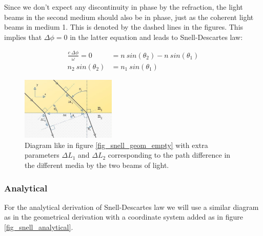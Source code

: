 \documentclass{article}
\begin{document}
Since we don't expect any discontinuity in phase by the refraction, the light beams in the second medium should also be in phase, just as the coherent light beams in medium 1. This is denoted by the dashed lines in the figures. This implies that $\Delta \phi = 0$ in the latter equation and leads to Snell-Descartes law:

\begin{align*}
	\frac{c \: \Delta \phi}{\omega} = 0 &=  n \: sin(\theta_2) - n \: sin(\theta_1) \\
	 n_2 \: sin(\theta_2) &= n_1 \: sin(\theta_1)
\end{align*}


\begin{figure}[h!]
	\centering
	\includegraphics[width=0.4\textwidth]{afbeeldingen/snell_geom.jpg}
	\caption{Diagram like in figure \ref{fig_snell_geom_empty} with extra parameters $\Delta L_1$ and $\Delta L_2$ corresponding to the path difference in the different media by the two beams of light.}
	\label{fig_snell_geom}
\end{figure}

 \newpage

\subsubsection{Analytical}

For the analytical derivation of Snell-Descartes law we will use a similar diagram as in the geometrical derivation with a coordinate system added as in figure \ref{fig_snell_analytical}.
\end{document}
